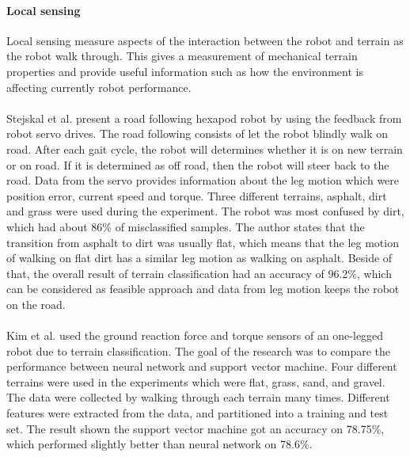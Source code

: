 \documentclass[USenglish]{ifimaster}  %
\begin{document}
	\paragraph{Local sensing}
	Local sensing measure aspects of the interaction between the robot and terrain as the robot walk through. This gives a measurement of mechanical terrain properties and provide useful information such as how the environment is affecting currently robot performance. 
	\\
	\\ 
	Stejskal et al. \cite{7487544} present a road following hexapod robot by using the feedback from robot servo drives. The road following consists of let the robot blindly walk on road. After each gait cycle, the robot will determines whether it is on new terrain or on road. If it is determined as off road, then the robot will steer back to the road. Data from the servo provides information about the leg motion which were position error, current speed and torque. Three different terrains, asphalt, dirt and grass were used during the experiment. The robot was most confused by dirt, which had about 86\% of misclassified samples. The author states that the transition from asphalt to dirt was usually flat, which means that the leg motion of walking on flat dirt has a similar leg motion as walking on asphalt. Beside of that, the overall result of terrain classification had an accuracy of 96.2\%, which can be considered as feasible approach and data from leg motion keeps the robot on the road.
	\\
	\\
	Kim et al. \cite{5602459} used the ground reaction force and torque sensors of an one-legged robot due to terrain classification. The goal of the research was to compare the performance between neural network and support vector machine. Four different terrains were used in the experiments which were flat, grass, sand, and gravel. The data were collected by walking through each terrain many times. Different features were extracted from the data, and partitioned into a training and test set. The result shown the support vector machine got an accuracy on 78.75\%, which performed slightly better than neural network on 78.6\%.
	\\
	\\
\end{document}
